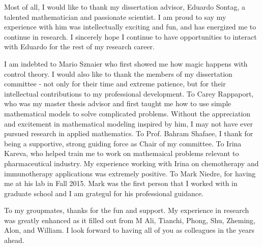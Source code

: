 
\begin{acknowledgements}

Most of all, I would like to thank my dissertation advisor, Eduardo Sontag, a talented mathematician and passionate scientist. I am proud to say my experience with him was intellectually exciting and fun, and has energized me to continue in research. I sincerely hope I continue to have opportunities to interact with Eduardo for the rest of my research career.

I am indebted to Mario Sznaier who first showed me how magic happens with control theory. I would also like to thank the members of my dissertation committee - not only for their time and extreme patience, but for their intellectual contributions to my professional development. To Carey Rappaport, who was my master thesis advisor and first taught me how to use simple mathematical models to solve complicated problems. Without the appreciation and excitement in mathematical modeling inspired by him, I may not have ever pursued research in applied mathematics. To Prof. Bahram Shafaee, I thank for being a supportive, strong guiding force as Chair of my committee. To Irina Kareva, who helped train me to work on mathemaical problems relevant to pharmaceutical industry. My experience working with Irina on chemotherapy and immunotherapy applications was extremely positive. To Mark Niedre, for having me at his lab in Fall 2015. Mark was the first person that I worked with in graduate school and I am grategul for his professional guidance.

To my groupmates, thanks for the fun and support. My experience in research was greatly enhanced as it filled out from M Ali, Tianchi, Phong, Shu, Zheming, Alon, and William. I look forward to having all of you as colleagues in the years ahead. 
\end{acknowledgements}


